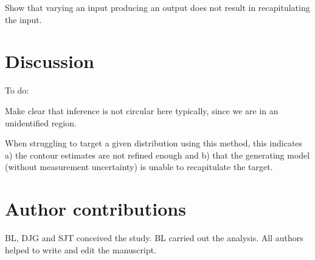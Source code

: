 \documentclass[10pt,letterpaper]{article}
\begin{document}
Show that varying an input producing an output does not result in recapitulating the input.


\section{Discussion}
\label{sec:discussion}
To do:

Make clear that inference is not circular here typically, since we are in an unidentified region.

When struggling to target a given distribution using this method, this indicates a) the contour estimates are not refined enough and b) that the generating model (without measurement uncertainty) is unable to recapitulate the target.


\section{Author contributions}
BL, DJG and SJT conceived the study. BL carried out the analysis. All authors helped to write and edit the manuscript.


\nolinenumbers



\end{document}
